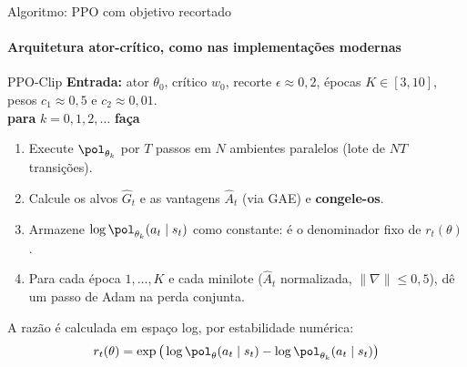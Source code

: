 \documentclass[aspectratio=169, 11pt]{beamer}
\newcommand{\Ahat}{\hat{A}}
\begin{document}
\begin{frame}{Algoritmo: PPO com objetivo recortado}
  \framesubtitle{Arquitetura ator-crítico, como nas implementações modernas}

  \begin{algbox}{PPO-Clip}
    \small
    \textbf{Entrada:} ator $\theta_0$, crítico $w_0$, recorte $\epsilon\approx 0{,}2$, épocas $K\in[3,10]$,
    pesos $c_1\approx 0{,}5$ e $c_2\approx 0{,}01$.\\
    \textbf{para} $k = 0, 1, 2, \dots$ \textbf{faça}
    \begin{enumerate}\setlength{\itemsep}{0pt}
      \item Execute $\pol_{\theta_k}$ por $T$ passos em $N$ ambientes paralelos (lote de $NT$ transições).
      \item Calcule os alvos $\hat G_t$ e as vantagens $\Ahat_t$ (via GAE) e \textbf{congele-os}.
      \item Armazene $\log\pol_{\theta_k}(a_t\mid s_t)$ como constante: é o denominador fixo de $r_t(\theta)$.
      \item Para cada época $1,\dots,K$ e cada minilote ($\Ahat_t$ normalizada, $\|\nabla\|\le 0{,}5$),
            dê um passo de Adam na perda conjunta.
    \end{enumerate}
  \end{algbox}
  {\small\color{rlCinza} A razão é calculada em espaço log, por estabilidade numérica:}
  \[
    r_t(\theta) = \exp\big(\log\pol_\theta(a_t\mid s_t) - \log\pol_{\theta_k}(a_t\mid s_t)\big)
  \]
\end{frame}
\end{document}
